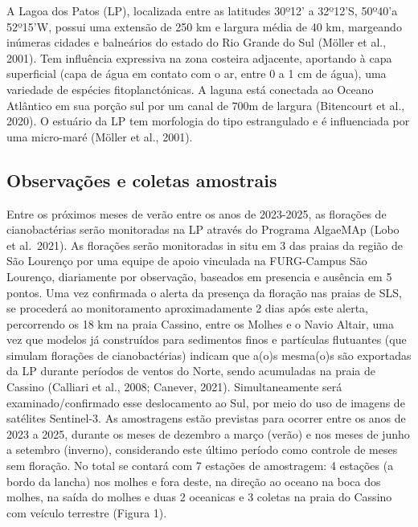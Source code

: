 \documentclass[
  super,
  preprint,
  3p]{elsarticle}
\begin{document}
A Lagoa dos Patos (LP), localizada entre as latitudes 30º12' a 32º12'S,
50º40'a 52º15'W, possui uma extensão de 250 km e largura média de 40 km,
margeando inúmeras cidades e balneários do estado do Rio Grande do Sul
(Möller et al., 2001). Tem influência expressiva na zona costeira
adjacente, aportando à capa superficial (capa de água em contato com o
ar, entre 0 a 1 cm de água), uma variedade de espécies fitoplanctónicas.
A laguna está conectada ao Oceano Atlântico em sua porção sul por um
canal de 700m de largura (Bitencourt et al., 2020). O estuário da LP tem
morfologia do tipo estrangulado e é influenciada por uma micro-maré
(Möller et al., 2001).

\hypertarget{observauxe7uxf5es-e-coletas-amostrais}{%
\subsection{Observações e coletas
amostrais}\label{observauxe7uxf5es-e-coletas-amostrais}}

Entre os próximos meses de verão entre os anos de 2023-2025, as
florações de cianobactérias serão monitoradas na LP através do Programa
AlgaeMAp (Lobo et al.~2021). As florações serão monitoradas in situ em 3
das praias da região de São Lourenço por uma equipe de apoio vinculada
na FURG-Campus São Lourenço, diariamente por observação, baseados em
presencia e ausência em 5 pontos. Uma vez confirmada o alerta da
presença da floração nas praias de SLS, se procederá ao monitoramento
aproximadamente 2 dias após este alerta, percorrendo os 18 km na praia
Cassino, entre os Molhes e o Navio Altair, uma vez que modelos já
construídos para sedimentos finos e partículas flutuantes (que simulam
florações de cianobactérias) indicam que a(o)s mesma(o)s são exportadas
da LP durante períodos de ventos do Norte, sendo acumuladas na praia de
Cassino (Calliari et al., 2008; Canever, 2021). Simultaneamente será
examinado/confirmado esse deslocamento ao Sul, por meio do uso de
imagens de satélites Sentinel-3. As amostragens estão previstas para
ocorrer entre os anos de 2023 a 2025, durante os meses de dezembro a
março (verão) e nos meses de junho a setembro (inverno), considerando
este último período como controle de meses sem floração. No total se
contará com 7 estações de amostragem: 4 estações (a bordo da lancha) nos
molhes e fora deste, na direção ao oceano na boca dos molhes, na saída
do molhes e duas 2 oceanicas e 3 coletas na praia do Cassino com veículo
terrestre (Figura 1).
\end{document}
